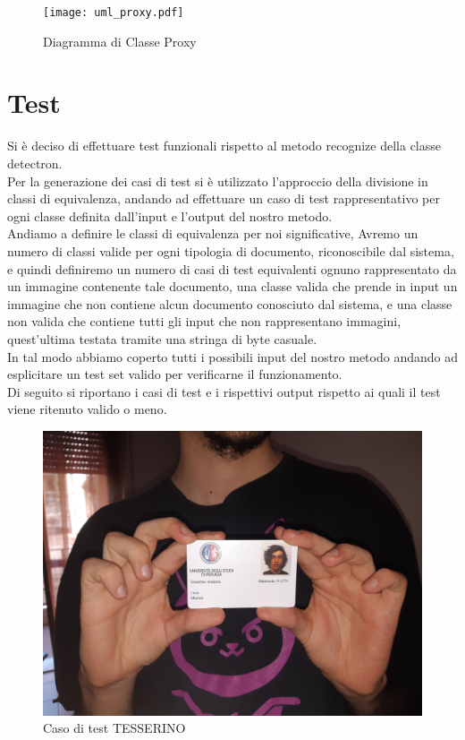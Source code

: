 \documentclass[12pt,a4paper]{article}
\begin{document}
\begin{figure}[H]
    \caption{Diagramma di Classe Proxy}
    \centering
    \texttt{[image: uml\_proxy.pdf]}
\end{figure}

\section{Test}

Si è deciso di effettuare test funzionali rispetto al metodo recognize
della classe detectron.\\
Per la generazione dei casi di test si è utilizzato l'approccio della
divisione in classi di equivalenza, andando ad effettuare un caso di
test rappresentativo per ogni classe definita dall'input e l'output del nostro
metodo.\\
Andiamo a definire le classi di equivalenza per noi significative,
Avremo un numero di classi valide per ogni tipologia di documento,
riconoscibile dal sistema, e quindi definiremo un numero di casi di
test equivalenti ognuno rappresentato da un immagine contenente tale
documento, una classe valida che prende in input un
immagine che non contiene alcun documento conosciuto dal sistema, e una
classe non valida che contiene tutti gli input che non rappresentano
immagini, quest'ultima testata tramite una stringa di byte casuale.\\
In tal modo abbiamo coperto tutti i possibili input del nostro metodo
andando ad esplicitare un test set valido per verificarne il
funzionamento.\\

Di seguito si riportano i casi di test e i rispettivi output rispetto ai
quali il test viene ritenuto valido o meno.

\begin{figure}[H]
    \caption{Caso di test TESSERINO}
    \centering
    \includegraphics[width=\textwidth,height=\textheight,keepaspectratio]{../test/test_tesserino.jpg}
\end{figure}
\end{document}
